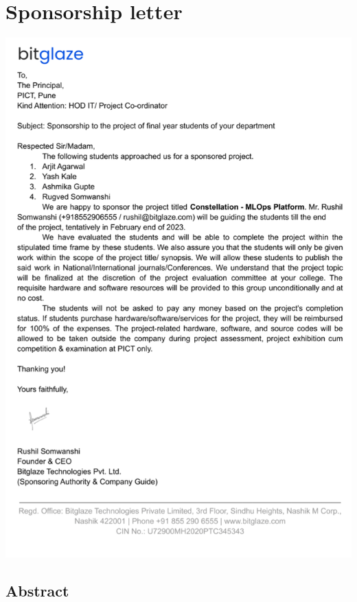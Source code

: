 \documentclass[12pt,a4paper]{report}     %
\begin{document}
\newpage
\section*{Sponsorship letter}
\includegraphics[]{Sponsorship_letter.png}
		\newpage					%
		\pagestyle{plain}           %
		\begin{center}				%
			\begin{LARGE}
						\section*{ Abstract}
			\end{LARGE}
		\end{center}
\end{document}
